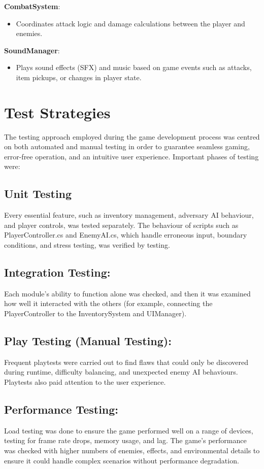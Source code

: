 \textbf{CombatSystem}:
\begin{itemize}
	\item Coordinates attack logic and damage calculations between the player and enemies.
\end{itemize}

\textbf{SoundManager}:
\begin{itemize}
	\item Plays sound effects (SFX) and music based on game events such as attacks, item pickups, or changes in player state.
	\end{itemize}
	

\section{Test Strategies}
The testing approach employed during the game development process was centred on both automated and manual testing in order to guarantee seamless gaming, error-free operation, and an intuitive user experience. Important phases of testing were:
	\subsection{Unit Testing}
	Every essential feature, such as inventory management, adversary AI behaviour, and player controls, was tested separately.
	The behaviour of scripts such as PlayerController.cs and EnemyAI.cs, which handle erroneous input, boundary conditions, and stress testing, was verified by testing.
	\subsection{Integration Testing:}
	Each module's ability to function alone was checked, and then it was examined how well it interacted with the others (for example, connecting the PlayerController to the InventorySystem and UIManager).
	\subsection{Play Testing (Manual Testing):}
	Frequent playtests were carried out to find flaws that could only be discovered during runtime, difficulty balancing, and unexpected enemy AI behaviours.
	Playtests also paid attention to the user experience.
	\subsection{Performance Testing:}
	Load testing was done to ensure the game performed well on a range of devices, testing for frame rate drops, memory usage, and lag.
	The game’s performance was checked with higher numbers of enemies, effects, and environmental details to ensure it could handle complex scenarios without performance degradation.
